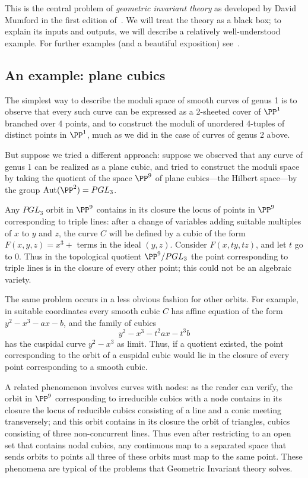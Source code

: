 This is the central problem of \emph{geometric invariant theory} as developed by David Mumford in the first edition of~\cite{GIT}. We will treat the theory as a black box; to explain its inputs and outputs, we will describe a relatively well-understood example. For further examples (and a beautiful exposition) see~\cite{IntroModuli}.

\subsection{An example: plane cubics}

The simplest way to describe the moduli space of smooth curves of genus 1 is to observe that every such curve can be expressed as a 2-sheeted cover of $\PP^1$ branched over 4 points, and to construct the moduli of unordered 4-tuples of distinct points in $\PP^1$, much as we did in the case of curves of genus 2 above.

But suppose we tried a different approach: suppose we observed that any curve of genus 1 can be realized as a plane cubic, and tried to construct the moduli space by taking the quotient of the space $\PP^9$ of plane cubics---the Hilbert space---by the group ${\rm Aut}(\PP^2) = PGL_3$. 

Any $PGL_3$ orbit in $\PP^9$ contains in its closure the locus of points in $\PP^9$ corresponding to triple lines: after a change of variables adding suitable multiples of $x$ to $y$ and $z$, the curve $C$ will be defined by a cubic of the form $F(x,y,z) = x^3+$ terms in the ideal $(y,z)$.
Consider $F(x,ty, tz)$, and let $t$ go to 0. Thus in the topological quotient $\PP^9/PGL_3$ the point corresponding to triple lines is in the closure of every other point; this could not be an algebraic variety.

The same problem occurs in a less obvious fashion for other orbits. For example, in suitable coordinates every smooth cubic $C$ has affine equation of the form $y^2-x^3 - ax - b$, and the family of cubics
$$
y^2 - x^3 - t^2ax - t^3b %
$$
has the cuspidal curve $y^2-x^3$ as limit. 
Thus, if a quotient existed, the point corresponding to the orbit of a cuspidal cubic would lie in the closure of every point corresponding to a smooth cubic. 

A related phenomenon involves curves with nodes: as the reader can verify, the orbit in $\PP^9$ corresponding to irreducible cubics with a node contains in its closure the locus of reducible cubics consisting of a line and a conic meeting transversely; and this orbit contains in its closure the orbit of triangles, cubics consisting of three non-concurrent lines. Thus even after restricting to an open set that contains nodal cubics, any continuous map 
to a separated space that sends orbits to points all three of these orbits must map to the same point.
These phenomena are typical of the problems that Geometric Invariant theory solves.

